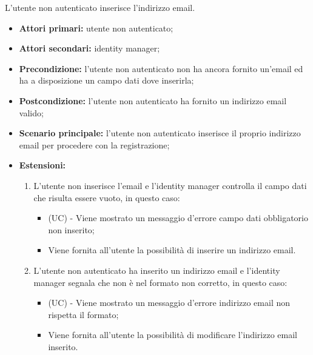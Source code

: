 L'utente non autenticato inserisce l'indirizzo email.
\begin{itemize}
	\item \textbf{Attori primari:} utente non autenticato;
	\item \textbf{Attori secondari:} identity manager;
	\item \textbf{Precondizione:} l'utente non autenticato non ha ancora fornito un'email ed ha a disposizione un campo dati dove inserirla;
	\item \textbf{Postcondizione:} l'utente non autenticato ha fornito un indirizzo email valido;
	\item \textbf{Scenario principale:} l'utente non autenticato inserisce il proprio indirizzo email per procedere con la registrazione;
	\item \textbf{Estensioni:}
	\begin{enumerate}
		\item L'utente non inserisce l'email e l'identity manager controlla il campo dati che risulta essere vuoto, in questo caso:
		\begin{itemize}
			\item (UC) - Viene mostrato un messaggio d'errore campo dati obbligatorio non inserito;
			\item Viene fornita all'utente la possibilità di inserire un indirizzo email.
		\end{itemize}
		\item L'utente non autenticato ha inserito un indirizzo email e l'identity manager segnala che non è nel formato non corretto, in questo caso:
		\begin{itemize}
			\item (UC) - Viene mostrato un messaggio d'errore indirizzo email non rispetta il formato;
			\item Viene fornita all'utente la possibilità di modificare l'indirizzo email inserito.
		\end{itemize}
	\end{enumerate}
\end{itemize}

